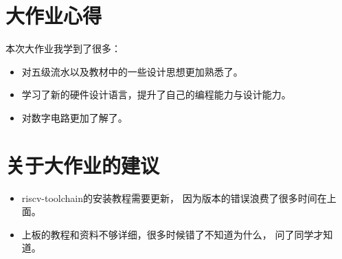 \section{大作业心得}
本次大作业我学到了很多：
\begin{itemize}
		\item 对五级流水以及教材中的一些设计思想更加熟悉了。
		\item 学习了新的硬件设计语言，提升了自己的编程能力与设计能力。
		\item 对数字电路更加了解了。
\end{itemize}
\section{关于大作业的建议}
\begin{itemize}
		\item riscv-toolchain的安装教程需要更新，
				因为版本的错误浪费了很多时间在上面。
		\item 上板的教程和资料不够详细，很多时候错了不知道为什么，
				问了同学才知道。
\end{itemize}




